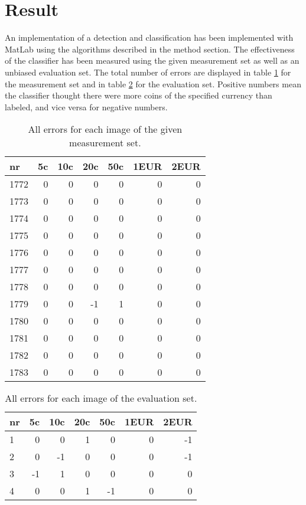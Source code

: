 \documentclass[doc/report.tex]{subfile}
\begin{document}
\section{Result}

An implementation of a detection and classification has been implemented with
MatLab using the algorithms described in the method section. The effectiveness
of the classifier has been measured using the given measurement set as well as
an unbiased evaluation set. The total number of errors are displayed in table
\ref{tab:meas} for the measurement set and in table \ref{tab:eval} for the
evaluation set. Positive numbers mean the classifier thought there were more
coins of the specified currency than labeled, and vice versa for negative
numbers.

\begin{table}
    \centering
    \begin{tabular}{lrrrrrr}
      nr  & 5c & 10c & 20c & 50c & 1EUR & 2EUR \\\hline
      1772 & 0  & 0   & 0   & 0   & 0   & 0 \\
      1773 & 0  & 0   & 0   & 0   & 0   & 0 \\
      1774 & 0  & 0   & 0   & 0   & 0   & 0 \\
      1775 & 0  & 0   & 0   & 0   & 0   & 0 \\
      1776 & 0  & 0   & 0   & 0   & 0   & 0 \\
      1777 & 0  & 0   & 0   & 0   & 0   & 0 \\
      1778 & 0  & 0   & 0   & 0   & 0   & 0 \\
      1779 & 0  & 0   & -1  & 1   & 0   & 0 \\
      1780 & 0  & 0   & 0   & 0   & 0   & 0 \\
      1781 & 0  & 0   & 0   & 0   & 0   & 0 \\
      1782 & 0  & 0   & 0   & 0   & 0   & 0 \\
      1783 & 0  & 0   & 0   & 0   & 0   & 0 \\
    \end{tabular}
    \caption{All errors for each image of the given measurement set.}
    \label{tab:meas}
\end{table}

\begin{table}
    \centering
    \begin{tabular}{lrrrrrr}
      nr  & 5c & 10c & 20c & 50c & 1EUR & 2EUR \\\hline
      1 & 0  & 0   & 1   & 0   & 0   & -1 \\
      2 & 0  & -1  & 0   & 0   & 0   & -1 \\
      3 & -1 & 1   & 0   & 0   & 0   & 0 \\
      4 & 0  & 0   & 1   & -1  & 0   & 0 \\
    \end{tabular}
    \caption{All errors for each image of the evaluation set.}
    \label{tab:eval}
\end{table}
\end{document}
